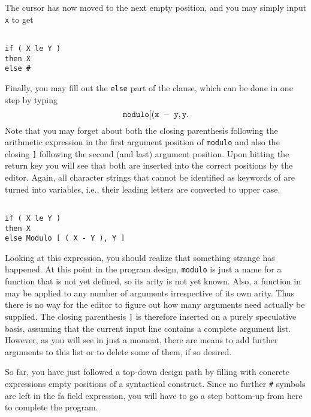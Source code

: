 The cursor has now moved to the next empty position, and you may simply
input {\tt x} to get 
\begin{verbatim}

if ( X le Y )
then X
else #

\end{verbatim}
Finally, you may fill out the {\tt else} part of the clause,  which can be done
in one step by typing
$$
 {\tt modulo[(x \; - \; y, y}.
$$
 Note that you may forget 
about both the closing parenthesis following the arithmetic expression in the first
argument position of {\tt modulo} and also the closing
{\tt ]} following the second (and last) argument position. Upon hitting the 
return key you will see that both are inserted into the correct positions
by the editor. Again, all character strings that cannot be identified
as keywords of \kir are turned into variables, i.e., their leading letters are
converted to upper case.
\begin{verbatim}

if ( X le Y )
then X
else Modulo [ ( X - Y ), Y ]

\end{verbatim}
Looking at this expression,
you should realize that something strange has happened. At this point in
the program 
design, {\tt modulo} is just a name for a function that is not yet defined, so
its arity is not yet known. Also, a function in \kir  may be
applied to any number of arguments irrespective of its own arity. Thus
there is no
way for the editor to figure out how many arguments need actually be supplied.
The closing parenthesis {\tt ]} is therefore inserted on a purely speculative
basis, assuming that the current input line contains a complete argument
list. However, as you will see in just a moment, there are means to add
further arguments to this list or to delete some of them, if so desired.

So far, you have just followed a top-down design path by filling
with concrete expressions  empty
positions of a syntactical construct. Since no
further {\tt \#} symbols are left in the {\sc fa} field expression, you
will have to go a step bottom-up from here to complete the program.

